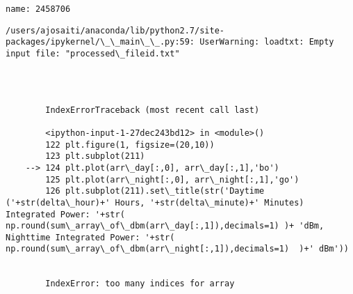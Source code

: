 \documentclass[11pt]{article}
\begin{document}
    \begin{Verbatim}[commandchars=\\\{\}]
name: 2458706

    \end{Verbatim}

    \begin{Verbatim}[commandchars=\\\{\}]
/users/ajosaiti/anaconda/lib/python2.7/site-packages/ipykernel/\_\_main\_\_.py:59: UserWarning: loadtxt: Empty input file: "processed\_fileid.txt"

    \end{Verbatim}

    \begin{Verbatim}[commandchars=\\\{\}]

        

        IndexErrorTraceback (most recent call last)

        <ipython-input-1-27dec243bd12> in <module>()
        122 plt.figure(1, figsize=(20,10))
        123 plt.subplot(211)
    --> 124 plt.plot(arr\_day[:,0], arr\_day[:,1],'bo')
        125 plt.plot(arr\_night[:,0], arr\_night[:,1],'go')
        126 plt.subplot(211).set\_title(str('Daytime ('+str(delta\_hour)+' Hours, '+str(delta\_minute)+' Minutes) Integrated Power: '+str(  np.round(sum\_array\_of\_dbm(arr\_day[:,1]),decimals=1) )+ 'dBm, Nighttime Integrated Power: '+str(  np.round(sum\_array\_of\_dbm(arr\_night[:,1]),decimals=1)  )+' dBm'))


        IndexError: too many indices for array

    \end{Verbatim}


    
    
    
    
\end{document}
